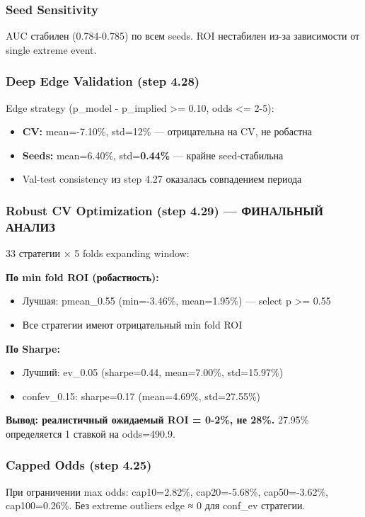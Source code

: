 \documentclass[12pt,a4paper]{article}
\begin{document}
\subsubsection{Seed Sensitivity}
AUC стабилен (0.784-0.785) по всем seeds. ROI нестабилен из-за зависимости от single extreme event.

\subsubsection{Deep Edge Validation (step 4.28)}
Edge strategy (p\_model - p\_implied >= 0.10, odds <= 2-5):
\begin{itemize}
  \item \textbf{CV:} mean=-7.10\%, std=12\% — отрицательна на CV, не робастна
  \item \textbf{Seeds:} mean=6.40\%, std=\textbf{0.44\%} — крайне seed-стабильна
  \item Val-test consistency из step 4.27 оказалась совпадением периода
\end{itemize}

\subsubsection{Robust CV Optimization (step 4.29) — ФИНАЛЬНЫЙ АНАЛИЗ}
33 стратегии × 5 folds expanding window:

\textbf{По min fold ROI (робастность):}
\begin{itemize}
  \item Лучшая: pmean\_0.55 (min=-3.46\%, mean=1.95\%) — select p >= 0.55
  \item Все стратегии имеют отрицательный min fold ROI
\end{itemize}

\textbf{По Sharpe:}
\begin{itemize}
  \item Лучший: ev\_0.05 (sharpe=0.44, mean=7.00\%, std=15.97\%)
  \item confev\_0.15: sharpe=0.17 (mean=4.69\%, std=27.55\%)
\end{itemize}

\textbf{Вывод: реалистичный ожидаемый ROI = 0-2\%, не 28\%.} 27.95\% определяется 1 ставкой на odds=490.9.

\subsubsection{Capped Odds (step 4.25)}
При ограничении max odds: cap10=2.82\%, cap20=-5.68\%, cap50=-3.62\%, cap100=0.26\%.
Без extreme outliers edge ≈ 0 для conf\_ev стратегии.
\end{document}
